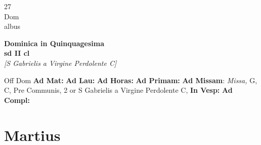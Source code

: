 \documentclass[10pt, openany]{book}
\begin{document}
        \begin{center}
            \begin{minipage}{3.5in}
                \vspace{2em}
                \begin{minipage}{0.5in}
                    {\Huge 27} \\
                    {\normalsize Dom} \\
                    {\normalsize albus}
                \end{minipage}
                \begin{minipage}{3.0in}
                    \textbf{ \large Dominica in Quinquagesima \\
                    \textnormal{\normalsize sd II cl}} \\ \textit{[S Gabrielis a Virgine Perdolente C]} \\ 
                \end{minipage}
                \begin{justify}Off Dom
                    \textbf{Ad Mat: }
                    \textbf{Ad Lau: }
                    \textbf{Ad Horas: }
                    \textbf{Ad Primam: }\textbf{Ad Missam}: \textit{Missa,} G, C, Pre Communis, 2 or S Gabrielis a Virgine Perdolente C,  
                    \textbf{In Vesp: }
                    \textbf{Ad Compl: }
                \end{justify}
            \end{minipage}
        \end{center}
    
        \chapter{Martius}
                        
\end{document}
